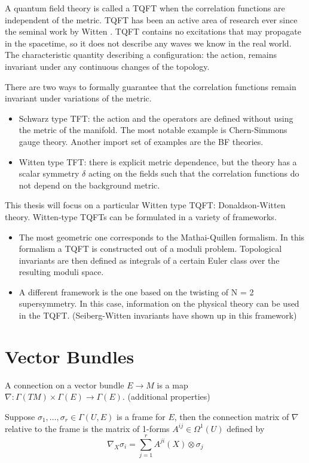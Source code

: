 A quantum field theory is called a TQFT when the correlation functions are
independent of the metric. 
TQFT has been an active area of research ever since the seminal work by Witten
\cite{wittenTQFT}. TQFT contains no excitations that may propagate in the
spacetime, so it does not describe any waves we know in the real world. The
characteristic quantity describing a configuration: the action, remains
invariant under any continuous changes of the topology. 

There are two ways to formally guarantee that the correlation functions remain
invariant under variations of the metric. %
\begin{itemize}
	\item Schwarz type TFT: the action and the operators are defined without 
		using the metric of the manifold. The most notable example is
		Chern-Simmons gauge theory. Another import set of examples are the BF
		theories. 
	\item Witten type TFT: there is explicit metric
	dependence, but the theory has a scalar symmetry $\delta$ acting on
	the fields such that the correlation
	functions do not depend on the background metric. 
\end{itemize}

This thesis will focus on a particular Witten type TQFT: Donaldson-Witten
theory. Witten-type TQFTs can be formulated in a variety of frameworks. 
\begin{itemize}
	\item 
 The most geometric one corresponds to the Mathai-Quillen formalism. In this
formalism a TQFT is constructed out of a moduli problem. Topological invariants
are then defined as integrals of a certain Euler class over the resulting moduli
space.\cite{cernTQFT}
	\item 
 A different framework is the one based on the twisting of N = 2 supersymmetry.
In this case, information on the physical theory can be used in the
TQFT. (Seiberg-Witten invariants have shown up in this framework)
\end{itemize}

\section{Vector Bundles}
A connection on a vector bundle $E \to M$ is a map  $\nabla : \Gamma(TM) \times
\Gamma(E) \to \Gamma(E)$. (additional properties)

Suppose $\sigma_1,\ldots,\sigma_r \in \Gamma(U,E)$ is a frame for $E$, then the
connection matrix of $\nabla$ relative to the frame is the matrix of 1-forms
$A^{ij}\in \Omega^{1}(U)$ defined by
\[
	\nabla_X \sigma_i = \sum_{j=1}^{r} A^{ji}(X) \otimes \sigma_j
\] 

